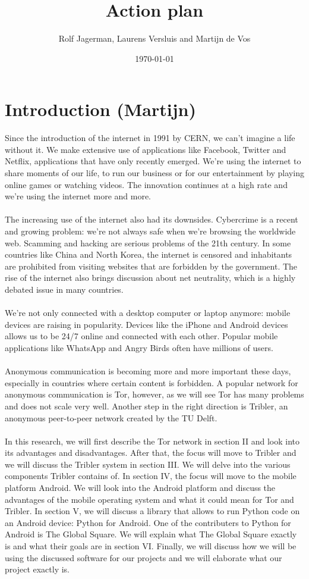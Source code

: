 \documentclass[11pt]{article}
\title{Action plan}
\author{Rolf Jagerman, Laurens Versluis and Martijn de Vos}
\date{\today}
\begin{document}
\maketitle

\pagebreak

\section{Introduction (Martijn)}
Since the introduction of the internet in 1991 by CERN, we can't imagine a life without it. We make extensive use of applications like Facebook, Twitter and Netflix, applications that have only recently emerged. We're using the internet to share moments of our life, to run our business or for our entertainment by playing online games or watching videos. The innovation continues at a high rate and we're using the internet more and more.\\\\
The increasing use of the internet also had its downsides. Cybercrime is a recent and growing problem: we're not always safe when we're browsing the worldwide web. Scamming and hacking are serious problems of the 21th century. In some countries like China and North Korea, the internet is censored and inhabitants are prohibited from visiting websites that are forbidden by the government. The rise of the internet also brings discussion about net neutrality, which is a highly debated issue in many countries.\\\\
We're not only connected with a desktop computer or laptop anymore: mobile devices are raising in popularity. Devices like the iPhone and Android devices allows us to be 24/7 online and connected with each other. Popular mobile applications like WhatsApp and Angry Birds often have millions of users.\\\\
Anonymous communication is becoming more and more important these days, especially in countries where certain content is forbidden. A popular network for anonymous communication is Tor, however, as we will see Tor has many problems and does not scale very well. Another step in the right direction is Tribler, an anonymous peer-to-peer network created by the TU Delft.\\\\
In this research, we will first describe the Tor network in section II and look into its advantages and disadvantages. After that, the focus will move to Tribler and we will discuss the Tribler system in section III. We will delve into the various components Tribler contains of. In section IV, the focus will move to the mobile platform Android. We will look into the Android platform and discuss the advantages of the mobile operating system and what it could mean for Tor and Tribler. In section V, we will discuss a library that allows to run Python code on an Android device: Python for Android. One of the contributers to Python for Android is The Global Square. We will explain what The Global Square exactly is and what their goals are in section VI. Finally, we will discuss how we will be using the discussed software for our projects and we will elaborate what our project exactly is.
\end{document}
